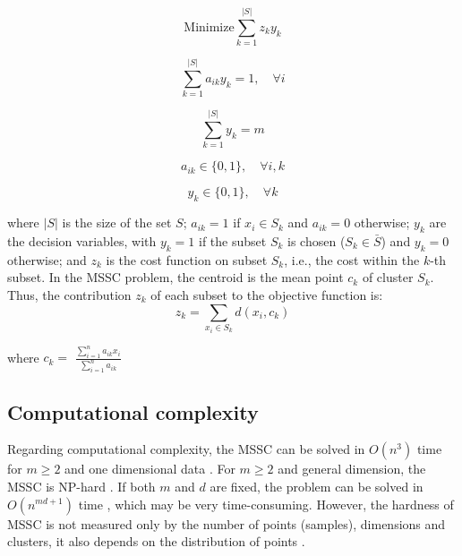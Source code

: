 \begin{equation} \label{eq:of}
\textrm{Minimize} \sum_{k=1}^{\left | S \right |}z_k y_k
\end{equation}

\begin{equation}
\sum_{k=1}^{\left | S \right |}a_{ik}y_k = 1, \quad \forall i
\end{equation}

\begin{equation}
\sum_{k=1}^{\left | S \right |}y_k = m
\end{equation}

\begin{equation}
a_{ik} \in \{0,1\}, \quad \forall i,k
\end{equation}

\begin{equation}
y_k \in \{0,1\}, \quad \forall k
\end{equation}

\noindent where $\left | S \right |$ is the size of the set $S$; $a_{ik} = 1$ if $x_i \in S_k$ and $a_{ik} = 0$ otherwise; $y_k$ are the decision variables, with $y_k = 1$ if the subset $S_k$ is chosen ($S_k \in \bar{S}$) and $y_k = 0$ otherwise; and $z_k$ is the cost function on subset $S_k$, i.e., the cost within the $k$-th subset. In the MSSC problem, the centroid is the mean point $c_k$ of cluster $S_k$. Thus, the contribution $z_k$ of each subset to the objective function is:
	\begin{equation}
	z_k = \sum_{x_i \in S_k} d(x_i, c_k)
	\end{equation}
	\begin{center}
	where $c_k = $ \Large $\frac{\sum_{i = 1}^{n}a_{ik}x_i}{\sum_{i = 1}^{n}a_{ik}}$	
	\end{center}
	
\subsection{Computational complexity}
Regarding computational complexity, the MSSC can be solved in $O(n^3)$ time for $m \geq 2$ and one dimensional data \cite{Spath1980}. For $m \geq 2$ and general dimension, the MSSC is NP-hard \cite{Aloise2009}. If both $m$ and $d$ are fixed, the problem can be solved in $O(n^{md+1})$ time \cite{Inaba1994}, which may be very time-consuming. However, the hardness of MSSC is not measured only by the number of points (samples), dimensions and clusters, it also depends on the distribution of points \cite{Aloise2009Branch}.


